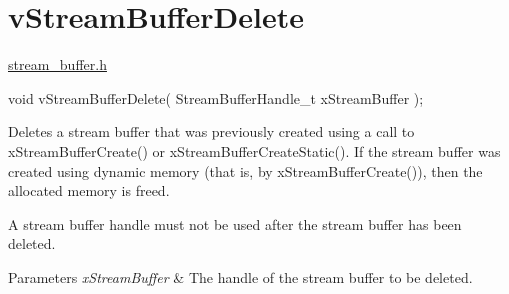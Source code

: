 \hypertarget{group__v_stream_buffer_delete}{}\section{v\+Stream\+Buffer\+Delete}
\label{group__v_stream_buffer_delete}
\mbox{\hyperlink{stream__buffer_8h_source}{stream\+\_\+buffer.\+h}}


\begin{DoxyPre}
void vStreamBufferDelete( StreamBufferHandle\_t xStreamBuffer );
\end{DoxyPre}


Deletes a stream buffer that was previously created using a call to x\+Stream\+Buffer\+Create() or x\+Stream\+Buffer\+Create\+Static(). If the stream buffer was created using dynamic memory (that is, by x\+Stream\+Buffer\+Create()), then the allocated memory is freed.

A stream buffer handle must not be used after the stream buffer has been deleted.


\begin{DoxyParams}{Parameters}
{\em x\+Stream\+Buffer} & The handle of the stream buffer to be deleted. \\
\hline
\end{DoxyParams}
